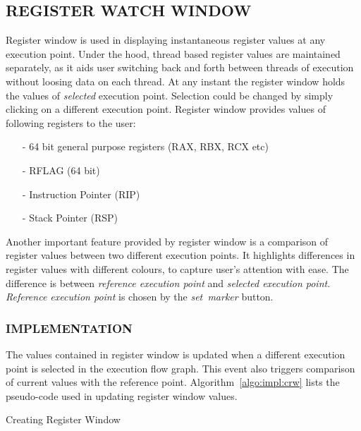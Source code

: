 \subsection {REGISTER WATCH WINDOW}
\label{sec:impl:rww}
Register window is used in displaying instantaneous register values at any execution point. Under the hood, thread based register values are maintained separately, as it aids user switching back and forth between threads of execution without loosing data on each thread. At any instant the register window holds the values of {\it selected} execution point. Selection could be changed by simply clicking on a different execution point. Register window provides values of following registers to the user:
\begin{itemize}
	\item[-] 64 bit general purpose registers (RAX, RBX, RCX etc)
	\item[-] RFLAG (64 bit)
	\item[-] Instruction Pointer (RIP)
	\item[-] Stack Pointer (RSP)
\end{itemize}

Another important feature provided by register window is a comparison of register values between two different execution points. It highlights differences in register values with different colours, to capture user's attention with ease. The difference is between {\it reference execution point} and {\it selected execution point}. {\it Reference execution point} is chosen by the {\it set~marker} button.

\subsubsection{IMPLEMENTATION}

The values contained in register window is updated when a different execution point is selected in the execution flow graph. This event also triggers comparison of current values with the reference point. Algorithm~\ref{algo:impl:crw} lists the pseudo-code used in updating register window values.

\IncMargin{1em}
\begin{algorithm}[h]
\DontPrintSemicolon
{} 
\BlankLine
{}
\caption{Creating Register Window}
\label{algo:impl:crw}
\end{algorithm}\DecMargin{1em}

